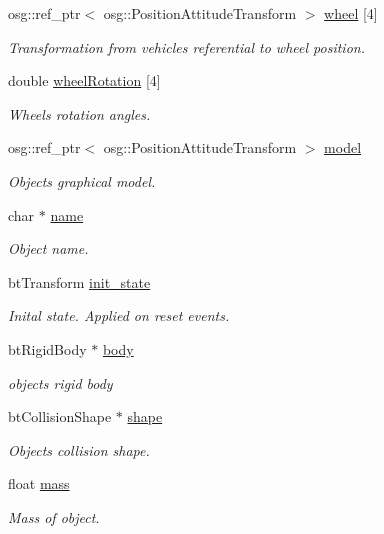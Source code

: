 \begin{DoxyCompactItemize}
osg\+::ref\+\_\+ptr$<$ osg\+::\+Position\+Attitude\+Transform $>$ \hyperlink{classbtosgVehicle_a37edb4c28551037829ffd79c7bc315ba}{wheel} \mbox{[}4\mbox{]}
\begin{DoxyCompactList}\small\item\em Transformation from vehicle\textquotesingle{}s referential to wheel position. \end{DoxyCompactList}\item 
double \hyperlink{classbtosgVehicle_a0a9cd6f2c9b0defc44cd5e2e8d597418}{wheel\+Rotation} \mbox{[}4\mbox{]}
\begin{DoxyCompactList}\small\item\em Wheels\textquotesingle{} rotation angles. \end{DoxyCompactList}\item 
osg\+::ref\+\_\+ptr$<$ osg\+::\+Position\+Attitude\+Transform $>$ \hyperlink{classbtosgObject_afd15726e7a214212d6d5815f8ac1ac6c}{model}
\begin{DoxyCompactList}\small\item\em Object\textquotesingle{}s graphical model. \end{DoxyCompactList}\item 
char $\ast$ \hyperlink{classbtosgObject_a12396e1362797a75473a2e833b579cc9}{name}
\begin{DoxyCompactList}\small\item\em Object name. \end{DoxyCompactList}\item 
bt\+Transform \hyperlink{classbtosgObject_a2dee023f311114e200df9b04c8c1b400}{init\+\_\+state}
\begin{DoxyCompactList}\small\item\em Inital state. Applied on reset events. \end{DoxyCompactList}\item 
bt\+Rigid\+Body $\ast$ \hyperlink{classbtosgObject_a64ccde0543c184ed1749fdb9c9699785}{body}
\begin{DoxyCompactList}\small\item\em object\textquotesingle{}s rigid body \end{DoxyCompactList}\item 
bt\+Collision\+Shape $\ast$ \hyperlink{classbtosgObject_a0f6a8da01cf643c321bffe86e42604b0}{shape}
\begin{DoxyCompactList}\small\item\em Object\textquotesingle{}s collision shape. \end{DoxyCompactList}\item 
float \hyperlink{classbtosgObject_a2418bb2194d5e9b0f1c51c84672ba7d1}{mass}
\begin{DoxyCompactList}\small\item\em Mass of object. \end{DoxyCompactList}\end{DoxyCompactItemize}


